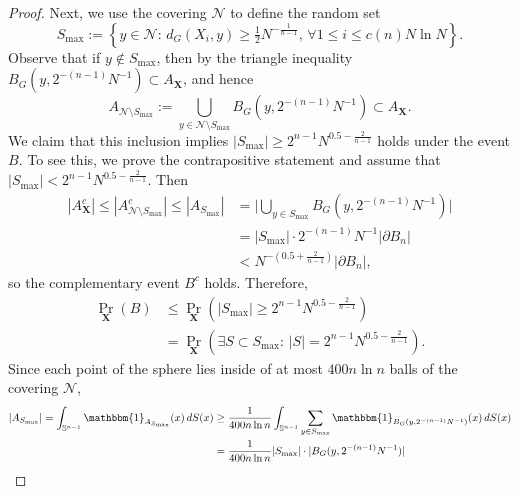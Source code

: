 \begin{proof}
	Next, we use the covering $\mathcal N$ to define the random  set %
	\[S_{\max} := \left\{y\in\mathcal N: \, d_G(X_i,y) \geq \tfrac{1}{2}N^{-\frac{1}{n-1}} , \, \forall 1 \leq i\leq c(n)N\ln N \right\}.\] 
	Observe that if $ y \notin S_{\max} $, then by the triangle inequality $ B_G(y, 2^{-(n-1)}N^{-1}) \subset A_{\mathbf X}$, and hence
	\[
	A_{\mathcal N\setminus S_{\max}} := \bigcup_{y\in\mathcal N\setminus S_{\max}} B_G(y, 2^{-(n-1)}N^{-1}) 
	\subset A_{\mathbf X}.
	\] 
	We claim that this inclusion implies  $ |S_{\max}| \geq 2^{n-1}N^{0.5-\frac{2}{n-1}}$ holds under the event $ B.$ To see this, we prove the contrapositive statement and assume that $|S_{\max}| < 2^{n-1}N^{0.5-\frac{2}{n-1}}$. Then 
	\begin{align*} 
	|A^c_{\mathbf X}| \leq |A^c_{\mathcal N\setminus S_{\max}}|
	\leq |A_{S_{\max}}| 
	&= \big|\bigcup_{ y \in S_{\max}}B_G(y,2^{-(n-1)}N^{-1})\big| \\
	&= |S_{\max}| \cdot 2^{-(n-1)}N^{-1}|\partial B_n| \\
	&< N^{-(0.5+\frac{2}{n-1})}|\partial B_n|,
	\end{align*} 
	so the complementary event $B^c$ holds. %
	Therefore,
	\begin{align}\label{starineq}
	\Pr_{\mathbf X}(B) &\leq \Pr_{\mathbf X}(|S_{\max}| \geq   2^{n-1}N^{0.5-\frac{2}{n-1}}) \nonumber
	\\&= \Pr_{\mathbf X}(\exists S \subset S_{\max}: \, |S| = 2^{n-1}N^{0.5-\frac{2}{n-1}}).
	\end{align}
Since each point of the sphere lies inside of at most $400 n\ln n$ balls of the covering $\mathcal{N}$,
	\begin{align}\label{Asmaxlower}
	|A_{S_{\max}}| = \int_{\Sn}\mathbbm{1}_{A_{S_{\max}}}(x)\,dS(x) %
	&\geq \frac{1}{400 n\ln n}\int_{\Sn}\sum_{y\in S_{\max}}\mathbbm{1}_{B_G(y,2^{-(n-1)}N^{-1})}(x)\,dS(x) \nonumber \\
	&=\frac{1}{400 n\ln n}|S_{\max}|\cdot|B_G(y,2^{-(n-1)}N^{-1})| \nonumber\\

\end{align}
\end{proof}
